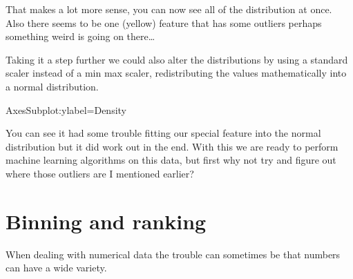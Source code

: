 \documentclass[letterpaper,10pt,english]{jupyterBook}
\begin{document}
\noindent{}

\sphinxAtStartPar
That makes a lot more sense, you can now see all of the distribution at once.
Also there seems to be one (yellow) feature that has some outliers perhaps something weird is going on there…

\sphinxAtStartPar
Taking it a step further we could also alter the distributions by using a standard scaler instead of a min max scaler, redistributing the values mathematically into a normal distribution.

\begin{sphinxVerbatim}[commandchars=\\\{\}]
   
\end{sphinxVerbatim}

\begin{sphinxVerbatim}[commandchars=\\\{\}]
  
 
\end{sphinxVerbatim}

\begin{sphinxVerbatim}[commandchars=\\\{\}]
\PYGZlt{}AxesSubplot:ylabel=\PYGZsq{}Density\PYGZsq{}\PYGZgt{}
\end{sphinxVerbatim}

\noindent{}

\sphinxAtStartPar
You can see it had some trouble fitting our special feature into the normal distribution but it did work out in the end.
With this we are ready to perform machine learning algorithms on this data, but first why not try and figure out where those outliers are I mentioned earlier?


\chapter{Binning and ranking}
\label{\detokenize{c2_data_preparation/binning_ranking:binning-and-ranking}}\label{\detokenize{c2_data_preparation/binning_ranking::doc}}
\sphinxAtStartPar
When dealing with numerical data the trouble can sometimes be that numbers can have a wide variety.
\end{document}
